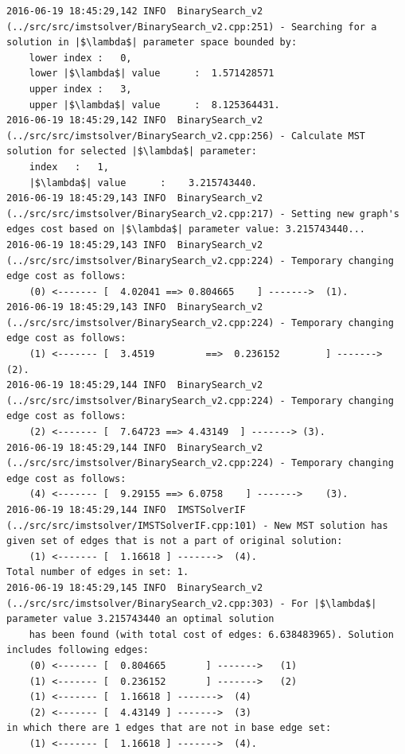 \begin{verbatim}
2016-06-19 18:45:29,142 INFO  BinarySearch_v2 (../src/src/imstsolver/BinarySearch_v2.cpp:251) - Searching for a solution in |$\lambda$| parameter space bounded by:
	lower index	:	0,
	lower |$\lambda$| value      :	1.571428571
	upper index	:	3,
	upper |$\lambda$| value      :	8.125364431.
2016-06-19 18:45:29,142 INFO  BinarySearch_v2 (../src/src/imstsolver/BinarySearch_v2.cpp:256) - Calculate MST solution for selected |$\lambda$| parameter:
	index	:	1,
	|$\lambda$| value      :	3.215743440.
2016-06-19 18:45:29,143 INFO  BinarySearch_v2 (../src/src/imstsolver/BinarySearch_v2.cpp:217) - Setting new graph's edges cost based on |$\lambda$| parameter value: 3.215743440...
2016-06-19 18:45:29,143 INFO  BinarySearch_v2 (../src/src/imstsolver/BinarySearch_v2.cpp:224) - Temporary changing edge cost as follows:
	(0)	<------- [	4.02041	==>	0.804665	] ------->	(1).
2016-06-19 18:45:29,143 INFO  BinarySearch_v2 (../src/src/imstsolver/BinarySearch_v2.cpp:224) - Temporary changing edge cost as follows:
	(1)	<------- [	3.4519         ==>	0.236152        ] ------->	(2).
2016-06-19 18:45:29,144 INFO  BinarySearch_v2 (../src/src/imstsolver/BinarySearch_v2.cpp:224) - Temporary changing edge cost as follows:
	(2)	<------- [	7.64723	==>	4.43149	 ] ------->	(3).
2016-06-19 18:45:29,144 INFO  BinarySearch_v2 (../src/src/imstsolver/BinarySearch_v2.cpp:224) - Temporary changing edge cost as follows:
	(4)	<------- [	9.29155	==>	6.0758	  ] ------->	(3).
2016-06-19 18:45:29,144 INFO  IMSTSolverIF (../src/src/imstsolver/IMSTSolverIF.cpp:101) - New MST solution has given set of edges that is not a part of original solution:
	(1)	<------- [	1.16618	] ------->	(4).
Total number of edges in set: 1.
2016-06-19 18:45:29,145 INFO  BinarySearch_v2 (../src/src/imstsolver/BinarySearch_v2.cpp:303) - For |$\lambda$| parameter value 3.215743440 an optimal solution 
	has been found (with total cost of edges: 6.638483965). Solution includes following edges:
	(0)	<------- [	0.804665       ] ------->	(1)
	(1)	<------- [	0.236152       ] ------->	(2)
	(1)	<------- [	1.16618	] ------->	(4)
	(2)	<------- [	4.43149	] ------->	(3)
in which there are 1 edges that are not in base edge set:
	(1)	<------- [	1.16618	] ------->	(4).
\end{verbatim}